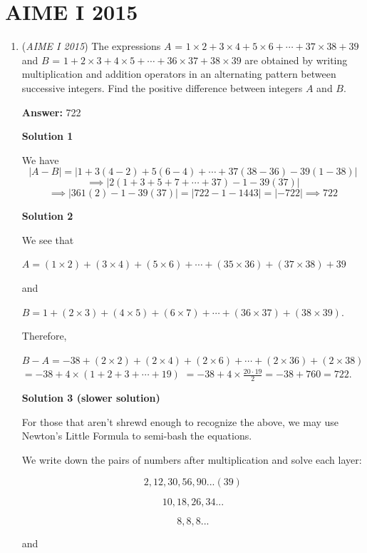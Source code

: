 \section{AIME I 2015}
        \begin{enumerate}
        	\item (\textit{AIME I 2015}) The expressions $A$ = $1 \times 2 + 3 \times 4 + 5 \times 6 + \cdots + 37 \times 38 + 39$ and $B$ = $1 + 2 \times 3 + 4 \times 5 + \cdots + 36 \times 37 + 38 \times 39$ are obtained by writing multiplication and addition operators in an alternating pattern between successive integers.  Find the positive difference between integers $A$ and $B$.


 



 
 \textbf{Answer: }722



\textbf{Solution 1}

We have 
 \[|A-B|=|1+3(4-2)+5(6-4)+ \cdots + 37(38-36)-39(1-38)|\]
 \[\implies |2(1+3+5+7+ \cdots +37)-1-39(37)|\]
 \[\implies |361(2)-1-39(37)|=|722-1-1443|=|-722|\implies \boxed{722}\]




\textbf{Solution 2}

We see that

 $A=(1\times 2)+(3\times 4)+(5\times 6)+\cdots +(35\times 36)+(37\times 38)+39$

 and

 $B=1+(2\times 3)+(4\times 5)+(6\times 7)+\cdots +(36\times 37)+(38\times 39)$.

 Therefore,

 $B-A=-38+(2\times 2)+(2\times 4)+(2\times 6)+\cdots +(2\times 36)+(2\times 38)$
$=-38+4\times (1+2+3+\cdots+19)$
$=-38+4\times\frac{20\cdot 19}{2}=-38+760=\boxed{722}.$




\textbf{Solution 3 (slower solution)}

For those that aren't shrewd enough to recognize the above, we may use Newton's Little Formula to semi-bash the equations.

 We write down the pairs of numbers after multiplication and solve each layer:

 

 \[2, 12, 30, 56, 90...(39)\]

 \[10, 18, 26, 34...\]

 \[8, 8, 8...\]

 and


\end{enumerate}
